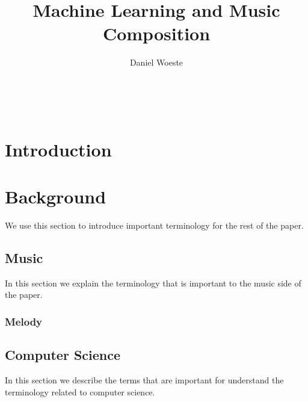 \documentclass{sig-alternate}
\begin{document}

\title{Machine Learning and Music Composition}
\author{
\alignauthor
Daniel Woeste\\
	\\
	\\
	\\
}



\maketitle
\begin{abstract}

\end{abstract}

\section{Introduction}
\label{sec:introduction}

\section{Background}
\label{sec:background}
	We use this section to introduce important terminology for the rest of the paper. 

\subsection{Music}
\label{sec:music}
	In this section we explain the terminology that is important to the music side of the paper.
\subsubsection{Melody}
\label{sec:melody}


\subsection{Computer Science}
\label{sec:computerscience}
	In this section we describe the terms that are important for understand the terminology related to computer science.
\end{document}
